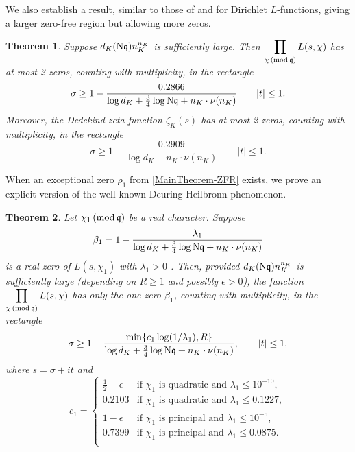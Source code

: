 \documentclass[12pt,psamsfonts]{amsart}
\newtheorem{thm}{Theorem}[section]
\theoremstyle{definition}
\theoremstyle{remark}
\newtheorem*{rem*}{Remark}
\numberwithin{equation}{section}
\begin{document}
We also establish a result,  similar to those of \cite{Graham} and \cite{HBLinnik} for Dirichlet $L$-functions, giving a larger zero-free region but allowing more zeros. 

\begin{thm} \label{MainTheorem-ZFR_2} Suppose $d_K (\mathrm{N}\mathfrak{q}) n_K^{n_K}$ is sufficiently large. 
\noindent
Then $\displaystyle \prod_{\chi \, (\mathrm{mod} {\, \mathfrak{q}}) } L(s,\chi)$ has at most 2 zeros, counting with multiplicity, in the rectangle
\[
\sigma \geq 1 - \frac{0.2866}{\log d_K+ \tfrac{3}{4} \log \mathrm{N}\mathfrak{q} + n_K \cdot \nu(n_K)} \qquad |t| \leq 1.
\]
Moreover, the Dedekind zeta function $\zeta_K(s)$ has at most 2 zeros, counting with multiplicity, in the rectangle
\[
\sigma \geq 1 - \frac{0.2909}{\log d_K+ n_K \cdot \nu(n_K)} \qquad |t| \leq 1.
\]
\end{thm}

When an exceptional zero $\rho_1$ from \cref{MainTheorem-ZFR} exists, we prove an explicit version of the well-known Deuring-Heilbronn phenomenon.  

\begin{thm} \label{MainTheorem-DH} Let $\chi_1 \, (\mathrm{mod} {\, \mathfrak{q}})$ be a real character. Suppose 
\[
\beta_1 = 1-\frac{\lambda_1}{\log d_K + \tfrac{3}{4}\log \mathrm{N}\mathfrak{q} + n_K \cdot \nu(n_K)}
\]
is a real zero of $L(s,\chi_1)$ with $\lambda_1 > 0$ . Then, provided $d_K(\mathrm{N}\mathfrak{q})n_K^{n_K}$ is sufficiently large (depending on $R \geq 1$ and possibly $\epsilon > 0$), the function $\displaystyle \prod_{\chi \, (\mathrm{mod} {\, \mathfrak{q}}) } L(s,\chi)$ has only the one zero $\beta_1$, counting with multiplicity, in the rectangle
\[
\sigma \geq 1 - \frac{\min\{ c_1 \log(1/\lambda_1), R\} }{\log d_K + \tfrac{3}{4}\log \mathrm{N}\mathfrak{q} + n_K \cdot \nu(n_K)}  , \qquad |t| \leq 1,
\]
where $s=\sigma+it$ and
\[
c_1 = \begin{cases} 
\tfrac{1}{2}-\epsilon & \text{if $\chi_1$ is quadratic and $\lambda_1 \leq 10^{-10}$}, \\
0.2103 & \text{if $\chi_1$ is quadratic and $\lambda_1 \leq 0.1227$}, \\ 
1-\epsilon & \text{if $\chi_1$ is principal and $\lambda_1 \leq 10^{-5}$}, \\
0.7399 & \text{if $\chi_1$ is principal and $\lambda_1 \leq 0.0875$}. \\ 
\end{cases}
\] 
\end{thm}
\end{document}
